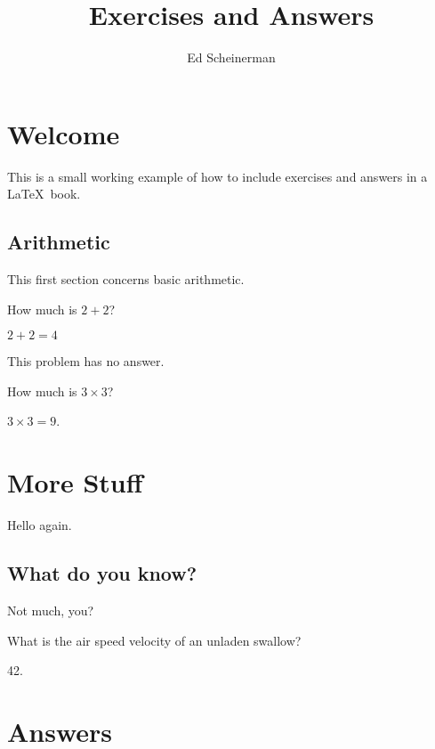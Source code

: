 \documentclass{book}
\title{Exercises and Answers}
\author{Ed Scheinerman}
\date{}
\begin{document}
\maketitle
\tableofcontents

\mainmatter

\chapter{Welcome}
This is a small working example of how to include exercises and
answers in a \LaTeX\ book. 

\section{Arithmetic}

This first section concerns basic arithmetic.

\begin{exercises}

\item How much is $2+2$?
  \begin{answer}
    $2+2= 4$ 
  \end{answer}

\item This problem has no answer.

\item How much is $3\times 3$? 
  \begin{answer}
    $3\times3 = 9$. 
  \end{answer}

\end{exercises}


\chapter{More Stuff}

Hello again.

\section{What do you know?}

Not much, you?

\begin{exercises}
  
\item What is the air speed velocity of an unladen swallow?

  \begin{answer}
    42.
  \end{answer}
\end{exercises}

\CloseMagicAnswerFile

\backmatter
\clearpage
\chapter*{Answers}

\end{document}
